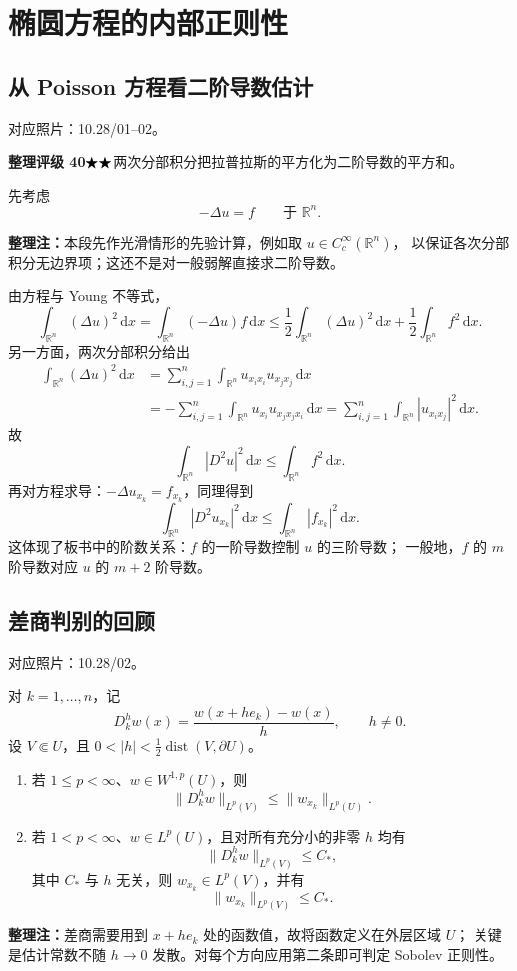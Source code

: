 \documentclass[UTF8,a4paper,11pt,fontset=fandol]{ctexart}
\newcommand{\R}{\mathbb R}
\newcommand{\dd}{\,\mathrm d}
\newcommand{\ednote}[1]{\par{\small\color{notegray}\textbf{整理注：}#1}\par}
\newcommand{\source}[1]{{\small\color{notegray}对应照片：#1。}\par}
\newcommand{\proofstars}[1]{\ensuremath{%
\ifnum#1>0\relax\bigstar\fi
\ifnum#1>1\relax\bigstar\fi
\ifnum#1>2\relax\bigstar\fi
\ifnum#1>3\relax\bigstar\fi
\ifnum#1>4\relax\bigstar\fi}}
\newcommand{\proofrating}[3]{\par{\small\color{proofblue}%
\textbf{整理评级 #1}\enspace\proofstars{#2}\quad #3\par}}
\begin{document}
\section{椭圆方程的内部正则性}
\subsection{从 Poisson 方程看二阶导数估计}
\source{10.28/01--02}
\proofrating{40}{2}{两次分部积分把拉普拉斯的平方化为二阶导数的平方和。}
先考虑
\[
-\Delta u=f\qquad\text{于 }\R^n.
\]
\ednote{本段先作光滑情形的先验计算，例如取 $u\in C_c^\infty(\R^n)$，
以保证各次分部积分无边界项；这还不是对一般弱解直接求二阶导数。}
由方程与 Young 不等式，
\[
\int_{\R^n}(\Delta u)^2\dd x
=\int_{\R^n}(-\Delta u)f\dd x
\leq\frac12\int_{\R^n}(\Delta u)^2\dd x
  +\frac12\int_{\R^n}f^2\dd x.
\]
另一方面，两次分部积分给出
\[
\begin{aligned}
\int_{\R^n}(\Delta u)^2\dd x
&=\sum_{i,j=1}^n\int_{\R^n}u_{x_ix_i}u_{x_jx_j}\dd x\\
&=-\sum_{i,j=1}^n\int_{\R^n}u_{x_i}u_{x_jx_jx_i}\dd x
=\sum_{i,j=1}^n\int_{\R^n}|u_{x_ix_j}|^2\dd x.
\end{aligned}
\]
故
\[
\boxed{\int_{\R^n}|D^2u|^2\dd x\leq\int_{\R^n}f^2\dd x.}
\]
再对方程求导：$-\Delta u_{x_k}=f_{x_k}$，同理得到
\[
\int_{\R^n}|D^2u_{x_k}|^2\dd x
\leq\int_{\R^n}|f_{x_k}|^2\dd x.
\]
这体现了板书中的阶数关系：$f$ 的一阶导数控制 $u$ 的三阶导数；
一般地，$f$ 的 $m$ 阶导数对应 $u$ 的 $m+2$ 阶导数。

\newpage
\subsection{差商判别的回顾}
\source{10.28/02}
对 $k=1,\ldots,n$，记
\[
D_k^h w(x)=\frac{w(x+he_k)-w(x)}{h},\qquad h\ne0.
\]
设 $V\Subset U$，且 $0<|h|<\tfrac12\operatorname{dist}(V,\partial U)$。
\begin{enumerate}
\item 若 $1\leq p<\infty$、$w\in W^{1,p}(U)$，则
\[
\boxed{\|D_k^h w\|_{L^p(V)}\leq\|w_{x_k}\|_{L^p(U)}.}
\]
\item 若 $1<p<\infty$、$w\in L^p(U)$，且对所有充分小的非零 $h$ 均有
\[
\|D_k^h w\|_{L^p(V)}\leq C_*,
\]
其中 $C_*$ 与 $h$ 无关，则 $w_{x_k}\in L^p(V)$，并有
\[
\boxed{\|w_{x_k}\|_{L^p(V)}\leq C_*.}
\]
\end{enumerate}
\ednote{差商需要用到 $x+he_k$ 处的函数值，故将函数定义在外层区域 $U$；
关键是估计常数不随 $h\to0$ 发散。对每个方向应用第二条即可判定 Sobolev 正则性。}
\end{document}
